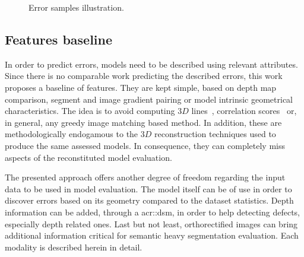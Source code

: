 \documentclass[runningheads]{llncs}
\newcounter{SubFigCounter}
\begin{document}
\begin{figure}
\begin{center}
{{                    \label{fig::fac_err}
                    \addtocounter{figure}{-1}
                }
            }
            {
                \caption{\label{fig::samples}Error samples illustration.}
            }
        \end{center}
        \vspace{-4em}
    \end{figure}

\subsection{Features baseline}
In order to predict errors, models need to be described using relevant attributes. Since there is no comparable work predicting the described errors, this work proposes a baseline of features. They are kept simple, based on depth map comparison, segment and image gradient pairing or model intrinsic geometrical characteristics. The idea is to avoid computing $3D$ lines~\cite{Michelin2013}, correlation scores~\cite{boudet2006supervised} or, in general, any greedy image matching based method. In addition, these are methodologically endogamous to the $3D$ reconstruction techniques used to produce the same assessed models. In consequence, they can completely miss aspects of the reconstituted model evaluation.

The presented approach offers another degree of freedom regarding the input data to be used in model evaluation. The model itself can be of use in order to discover errors based on its geometry compared to the dataset statistics. Depth information can be added, through a \acrshort{acr::dsm}, in order to help detecting defects, especially depth related ones. Last but not least, orthorectified images can bring additional information critical for semantic heavy segmentation evaluation. Each modality is described herein in detail.
\end{document}
